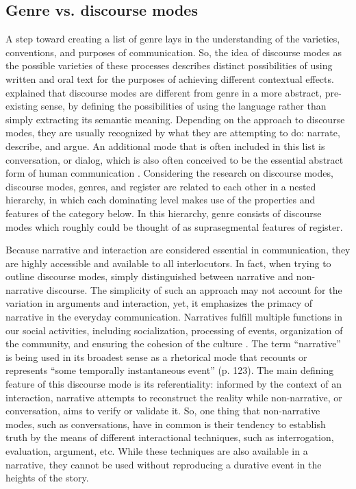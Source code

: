 \documentclass[12pt, draft]{article}
\begin{document}
\subsection{Genre vs. discourse modes}
A step toward creating a list of genre lays in the understanding of the varieties, conventions, and purposes of communication. So, the idea of discourse modes as the possible varieties of these processes describes distinct possibilities of using written and oral text for the purposes of achieving different contextual effects. \textcite[p. 54]{bax2011} explained that discourse modes are different from genre in a more abstract, pre-existing sense, by defining the possibilities of using the language rather than simply extracting its semantic meaning. Depending on the approach to discourse modes, they are usually recognized by what they are attempting to do: narrate, describe, and argue. An additional mode that is often included in this list is conversation, or dialog, which is also often conceived to be the essential abstract form of human communication \parencite{bakhtin1986, bax2011}. Considering the research on discourse modes, discourse modes, genres, and register are related to each other in a nested hierarchy, in which each dominating level makes use of the properties and features of the category below. In this hierarchy, genre consists of discourse modes which roughly could be thought of as suprasegmental features of register.

Because narrative and interaction are considered essential in communication, they are highly accessible and available to all interlocutors.  In fact, when trying to outline discourse modes, \textcite{georgakopoulou2000} simply distinguished between narrative and non-narrative discourse. The simplicity of such an approach may not account for the variation in arguments and interaction, yet, it emphasizes the primacy of narrative in the everyday communication. Narratives fulfill multiple functions in our social activities, including socialization, processing of events, organization of the community, and ensuring the cohesion of the culture \parencite{georgakopoulou2000}. The term ``narrative'' is being used in its broadest sense as a rhetorical mode that recounts or represents ``some temporally instantaneous event'' (p. 123). The main defining feature of this discourse mode is its referentiality: informed by the context of an interaction, narrative attempts to reconstruct the reality while non-narrative, or conversation, aims to verify or validate it. So, one thing that non-narrative modes, such as conversations, have in common is their tendency to establish truth by the means of different interactional techniques, such as interrogation, evaluation, argument, etc. While these techniques are also available in a narrative, they cannot be used without reproducing a durative event in the heights of the story. 
\end{document}
